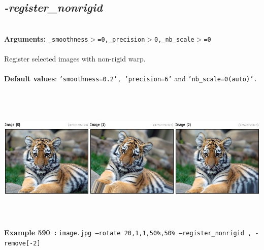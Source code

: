 \documentclass[a4paper,11pt,twoside]{book}
\begin{document}
\subsection{\emph{-register\_nonrigid} }\vspace*{-0.5em}
~\\\textbf{Arguments: } 
{\small \texttt{\_smoothness$>$=0,\_precision$>$0,\_nb\_scale$>$=0}}\\~\\
Register selected images with non-rigid warp.
~\\~\\\textbf{Default values}: {\small \texttt{'smoothness=0.2', 'precision=6'} and \texttt{'nb\_scale=0(auto)'.}}
\begin{center}\includegraphics[keepaspectratio=true,height=7cm,width=\textwidth]{img/gmic_def590.jpg}\\
{\footnotesize \textbf{Example 590~:} \texttt{image.jpg --rotate 20,1,1,50\%,50\% --register\_nonrigid , -remove[-2]}}
\end{center}
\end{document}
